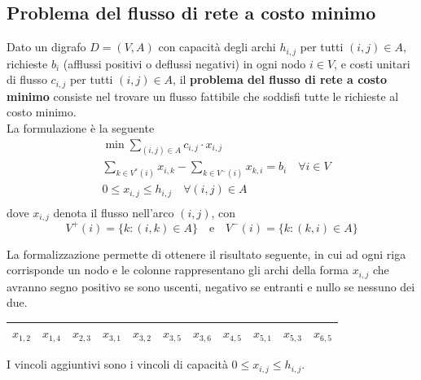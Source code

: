 \documentclass[a4paper]{extarticle}
\renewcommand\arraystretch{}
\begin{document}
\subsection{Problema del flusso di rete a costo minimo}
Dato un digrafo $D = (V, A)$ con capacità degli archi $h_{i,j}$ per tutti $(i, j) \in A$, richieste $b_i$ (afflussi positivi o deflussi negativi) in ogni nodo $i\in V$, e costi unitari di flusso $c_{i,j}$ per tutti $(i,j) \in A$, il \textbf{problema del flusso di rete a costo minimo} consiste nel trovare un flusso fattibile che soddisfi tutte le richieste al costo minimo.\\
La formulazione è la seguente
\begin{align*}
    &\min \sum_{(i,j) \in A} c_{i,j} \cdot x_{i,j}\\
    &\sum_{k \in V^*(i)} x_{i,k} - \sum_{k \in V^-(i)} x_{k,i} = b_i \hspace{1em} \forall i \in V\\
    & 0 \leq x_{i,j} \leq h_{i,j} \hspace{1em} \forall (i,j) \in A\\
\end{align*}
dove $x_{i,j}$ denota il flusso nell'arco $(i,j)$,
con
\[V^+(i) = \{k : (i,k) \in A\} \hspace{1em} \text{e} \hspace{1em} V^-(i) = \{k : (k, i) \in A\}\]

\vspace{1em}
\noindent
La formalizzazione permette di ottenere il risultato seguente, in cui ad ogni riga corrisponde un nodo e le colonne rappresentano gli archi della forma $x_{i,j}$ che avranno segno positivo se sono uscenti, negativo se entranti e nullo se nessuno dei due.

\vspace{1em}
\noindent
\begin{table}[H]
    \setlength{\tabcolsep}{8pt}
    \renewcommand{\arraystretch}{1.5}
    \noindent
    \centering
    \begin{tabular}{ccccccccccc}
        $x_{1,2}$ & $x_{1,4}$ & $x_{2,3}$ & $x_{3,1}$ & $x_{3,2}$ & $x_{3,5}$ & $x_{3,6}$ & $x_{4,5}$ & $x_{5,1}$ & $x_{5,3}$ & $x_{6,5}$\\
        \hline
    \end{tabular}
\end{table}

\vspace{1em}
\noindent
I vincoli aggiuntivi sono i vincoli di capacità $0 \leq x_{i,j} \leq h_{i,j}$.
\end{document}
